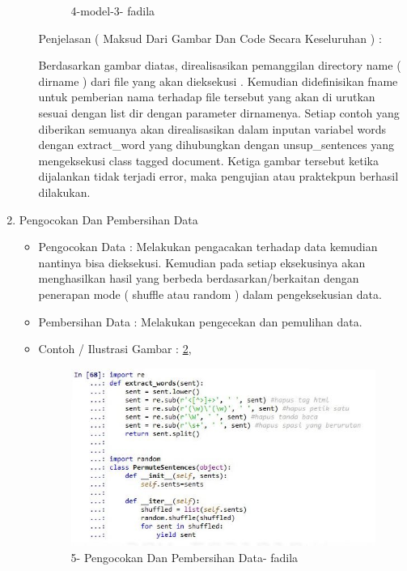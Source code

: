 \begin{enumerate}
\begin{itemize}
\begin{figure}[!hbtp]
\caption{4-model-3- fadila}
\label{4-model-3- fadila}
\end{figure}
\par Penjelasan ( Maksud Dari Gambar Dan Code Secara Keseluruhan ) : 
\par Berdasarkan gambar diatas, direalisasikan pemanggilan directory name ( dirname ) dari file yang akan dieksekusi . Kemudian didefinisikan fname untuk pemberian nama terhadap file tersebut yang akan di urutkan sesuai dengan list dir dengan parameter dirnamenya. Setiap contoh yang diberikan semuanya akan direalisasikan dalam inputan variabel words dengan extract\_word yang dihubungkan dengan unsup\_sentences yang mengeksekusi class tagged document. Ketiga gambar tersebut ketika dijalankan tidak terjadi error, maka pengujian atau praktekpun berhasil dilakukan.
\par
\end{itemize}
\item Pengocokan Dan Pembersihan Data
\begin{itemize}
\item Pengocokan Data : Melakukan pengacakan terhadap data kemudian nantinya bisa dieksekusi. Kemudian pada setiap eksekusinya akan menghasilkan hasil yang berbeda berdasarkan/berkaitan dengan penerapan mode ( shuffle atau random ) dalam pengeksekusian data.
\item Pembersihan Data : Melakukan pengecekan dan pemulihan data.
\item Contoh / Ilustrasi Gambar : \ref{5-pengpem-fadila}, 
\par
\begin{figure}[!hbtp]
\centering
\includegraphics[scale=0.3]{figures/5-pengpem-fadila.jpg}
\caption{5- Pengocokan Dan Pembersihan Data- fadila}
\label{5-pengpem-fadila}
\end{figure}

\end{itemize}
\end{enumerate}
